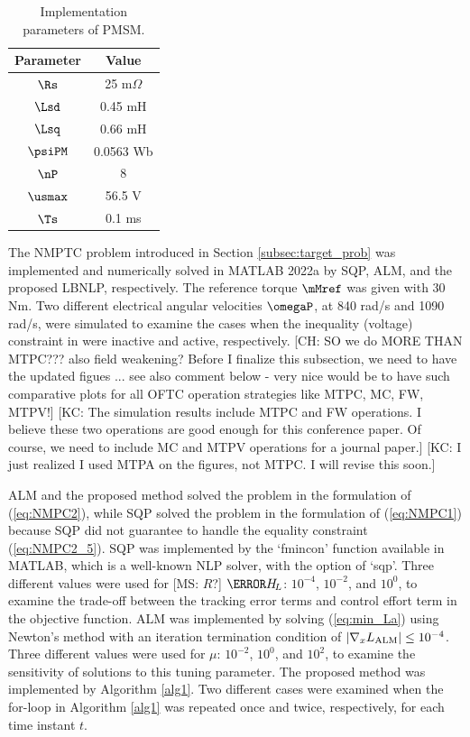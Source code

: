 \documentclass[journal]{IEEEtranTIE}
\newcommand{\CHHA}[1]{{\color{red} [CH: #1]}} %
\newcommand{\KYCH}[1]{{\color{blue} [KC: #1]}} %
\newcommand{\MSRY}[1]{{\color{magenta} [MS: #1]}} %
\begin{document}
\begin{table}
\caption{Implementation parameters of PMSM.}\label{tab:Comparison of LBNLP, SQP and ALM}
\centering
{\begin{tabular}{cc}\hline
Parameter & Value \\\hline\hline
\rowcolor{lightgray}
$\Rs$ & 25 m$\Omega$\\
$\Lsd$ & 0.45 mH\\
\rowcolor{lightgray}
$\Lsq$ & 0.66 mH\\
$\psiPM$ & 0.0563 Wb\\
\rowcolor{lightgray}
$\nP$ & 8\\
$\usmax$ & 56.5 V \\
\rowcolor{lightgray}
$\Ts$ & 0.1 ms \\\hline
\end{tabular}}
\end{table}



The NMPTC problem introduced in Section \ref{subsec:target_prob} was implemented and numerically solved in MATLAB 2022a by SQP, ALM, and the proposed LBNLP, respectively. The reference torque $\mMref$ was given with 30 Nm. Two different electrical angular velocities $\omegaP$, at 840 rad/s and 1090 rad/s, were simulated to examine the cases when the inequality (voltage) constraint in were inactive and active, respectively. \CHHA{SO we do MORE THAN MTPC??? also field weakening? Before I finalize this subsection, we need to have the updated figues ... see also comment below - very nice would be to have such comparative plots for all OFTC operation strategies like MTPC, MC, FW, MTPV!}
\KYCH{The simulation results include MTPC and FW operations. I believe these two operations are good enough for this conference paper. Of course, we need to include MC and MTPV operations for a journal paper.}
\KYCH{I just realized I used MTPA on the figures, not MTPC. I will revise this soon.}

ALM and the proposed method solved the problem in the formulation of (\ref{eq:NMPC2}), while SQP solved the problem in the formulation of (\ref{eq:NMPC1}) because SQP did not guarantee to handle the equality constraint (\ref{eq:NMPC2_5}). SQP was implemented by the `fmincon' function available in MATLAB, which is a well-known NLP solver, with the option of `sqp'. Three different values were used for 
\MSRY{$R$?}
$\mm{H}_{\!L}$: $10^{-4}$, $10^{-2}$, and $10^{0}$, to examine the trade-off between the tracking error terms and control effort term in the objective function. ALM was implemented by solving (\ref{eq:min_La}) using Newton's method with an iteration termination condition of $\left| \nabla_x L_{\rm ALM} \right| \le 10^{-4}$. Three different values were used for $\mu$: $10^{-2}$, $10^{0}$, and $10^{2}$, to examine the sensitivity of solutions to this tuning parameter. The proposed method was implemented by Algorithm \ref{alg1}. Two different cases were examined when the for-loop in Algorithm \ref{alg1} was repeated once and twice, respectively, for each time instant $t$.
\end{document}
